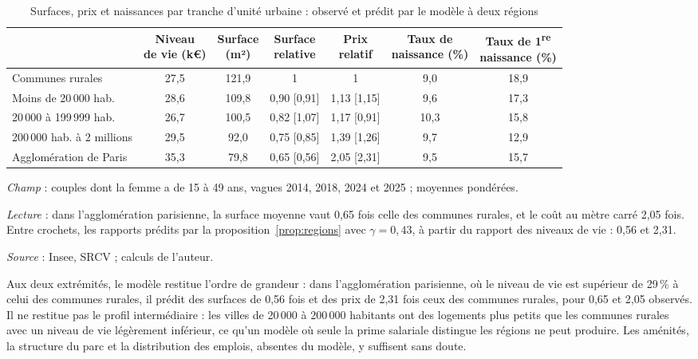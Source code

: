 \documentclass[11pt,a4paper]{article}
\theoremstyle{plain}
\theoremstyle{definition}
\theoremstyle{remark}
\begin{document}
\begin{table}[htbp]
\centering\small
\begin{threeparttable}
\caption{Surfaces, prix et naissances par tranche d'unité urbaine : observé et prédit par le modèle à deux régions}\label{tab:geo}
\begin{tabular}{@{}lcccccc@{}}
\toprule
& \shortstack{Niveau\\de vie (k€)} & \shortstack{Surface\\(m²)} & \shortstack{Surface\\relative} & \shortstack{Prix\\relatif} & \shortstack{Taux de\\naissance (\%)} & \shortstack{Taux de 1\textsuperscript{re}\\naissance (\%)} \\
\midrule
Communes rurales             & 27,5 & 121,9 & 1        & 1        & 9,0  & 18,9 \\
Moins de 20\,000 hab.        & 28,6 & 109,8 & 0,90 [0,91] & 1,13 [1,15] & 9,6  & 17,3 \\
20\,000 à 199\,999 hab.      & 26,7 & 100,5 & 0,82 [1,07] & 1,17 [0,91] & 10,3 & 15,8 \\
200\,000 hab. à 2 millions   & 29,5 & 92,0  & 0,75 [0,85] & 1,39 [1,26] & 9,7  & 12,9 \\
Agglomération de Paris       & 35,3 & 79,8  & 0,65 [0,56] & 2,05 [2,31] & 9,5  & 15,7 \\
\bottomrule
\end{tabular}
\begin{tablenotes}\scriptsize
\item \textit{Champ} : couples dont la femme a de 15 à 49 ans, vagues 2014, 2018, 2024 et 2025 ; moyennes pondérées.
\item \textit{Lecture} : dans l'agglomération parisienne, la surface moyenne vaut 0,65 fois celle des communes rurales, et le coût au mètre carré 2,05 fois. Entre crochets, les rapports prédits par la proposition~\ref{prop:regions} avec $\gamma = 0{,}43$, à partir du rapport des niveaux de vie : 0,56 et 2,31.
\item \textit{Source} : Insee, SRCV ; calculs de l'auteur.
\end{tablenotes}
\end{threeparttable}
\end{table}

Aux deux extrémités, le modèle restitue l'ordre de grandeur : dans l'agglomération parisienne, où le niveau de vie est supérieur de 29\,\% à celui des communes rurales, il prédit des surfaces de 0,56 fois et des prix de 2,31 fois ceux des communes rurales, pour 0,65 et 2,05 observés. Il ne restitue pas le profil intermédiaire : les villes de 20\,000 à 200\,000 habitants ont des logements plus petits que les communes rurales avec un niveau de vie légèrement inférieur, ce qu'un modèle où seule la prime salariale distingue les régions ne peut produire. Les aménités, la structure du parc et la distribution des emplois, absentes du modèle, y suffisent sans doute.
\end{document}
